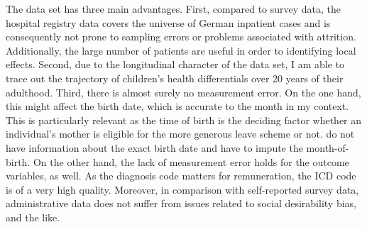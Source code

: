 \documentclass[11pt, a4paper]{article} %
\begin{document}
The data set has three main advantages. First, compared to survey data, the hospital registry data covers the universe of German inpatient cases and is consequently not prone to sampling errors or problems associated with attrition. Additionally, the large number of patients are useful in order to identifying local effects. Second, due to the longitudinal character of the data set, I am able to trace out the trajectory of children's health differentials over 20 years of their adulthood. Third, there is almost surely no measurement error. On the one hand, this might affect the birth date, which is accurate to the month in my context. This is particularly relevant as the time of birth is the deciding factor whether an individual's mother is eligible for the more generous leave scheme or not. \cite{Dustmann2012} do not have information about the exact birth date and have to impute the month-of-birth. On the other hand, the lack of measurement error holds for the outcome variables, as well. As the diagnosis code matters for remuneration, the ICD code is of a very high quality. Moreover, in comparison with self-reported survey data, administrative data does not suffer from issues related to social desirability bias, and the like.\newline
\end{document}
